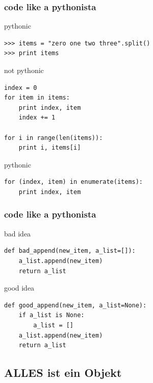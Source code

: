 \documentclass{beamer}
\begin{document}
\begin{frame}[fragile]
	\frametitle{code like a pythonista}

	\begin{exampleblock}{pythonic}
	\begin{lstlisting}
>>> items = "zero one two three".split()
>>> print items
    \end{lstlisting}
	\end{exampleblock}
  	\pause
	\begin{alertblock}{not pythonic}
	\begin{lstlisting}
index = 0
for item in items:
    print index, item
    index += 1

for i in range(len(items)):
    print i, items[i]
    \end{lstlisting}
	\end{alertblock}
  	\pause	
	\begin{exampleblock}{pythonic}
    \begin{lstlisting}
for (index, item) in enumerate(items):
    print index, item
    \end{lstlisting}
	\end{exampleblock}
\end{frame}

\begin{frame}[fragile]
	\frametitle{code like a pythonista}
	
	\begin{alertblock}{bad idea}
	\begin{lstlisting} 
def bad_append(new_item, a_list=[]):
    a_list.append(new_item)
    return a_list
    \end{lstlisting}%
	\end{alertblock}
 	\pause
	\begin{exampleblock}{good idea}
	\begin{lstlisting}
def good_append(new_item, a_list=None):
    if a_list is None:
        a_list = []
    a_list.append(new_item)
    return a_list
    \end{lstlisting}
	\end{exampleblock}
\end{frame}


\subsection{ALLES ist ein Objekt}
\end{document}

